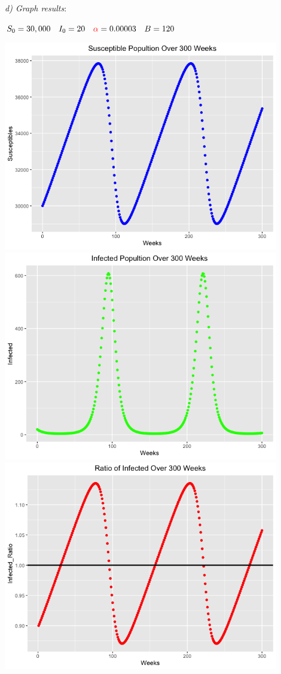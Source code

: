 \documentclass[12pt]{article}
\begin{document}
\break
\textit{d) Graph results}:
\begin{center}
\normalsize $S_0 = 30,000 \quad I_0 = 20 \quad \textcolor{red} {\alpha} = 0.00003 \quad B = 120$
\end{center}
\begin{center}
\includegraphics[width=12cm, ]{susceptible.png}
\includegraphics[width=12cm, ]{infected.png}
\includegraphics[width=12cm, ]{ratio_infected.png}
\end{center}
\end{document}
